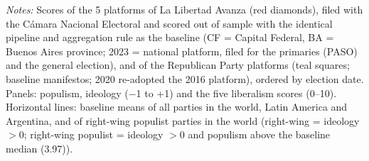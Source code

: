 \par\smallskip\begin{minipage}{\linewidth}\scriptsize\textit{Notes:} Scores of the 5 platforms of La Libertad Avanza (red diamonds), filed with the C\'amara Nacional Electoral and scored out of sample with the identical pipeline and aggregation rule as the baseline (CF = Capital Federal, BA = Buenos Aires province; 2023 = national platform, filed for the primaries (PASO) and the general election), and of the Republican Party platforms (teal squares; baseline manifestos; 2020 re-adopted the 2016 platform), ordered by election date. Panels: populism, ideology ($-$1 to +1) and the five liberalism scores (0--10). Horizontal lines: baseline means of all parties in the world, Latin America and Argentina, and of right-wing populist parties in the world (right-wing = ideology $> 0$; right-wing populist = ideology $> 0$ and populism above the baseline median (3.97)).\end{minipage}

